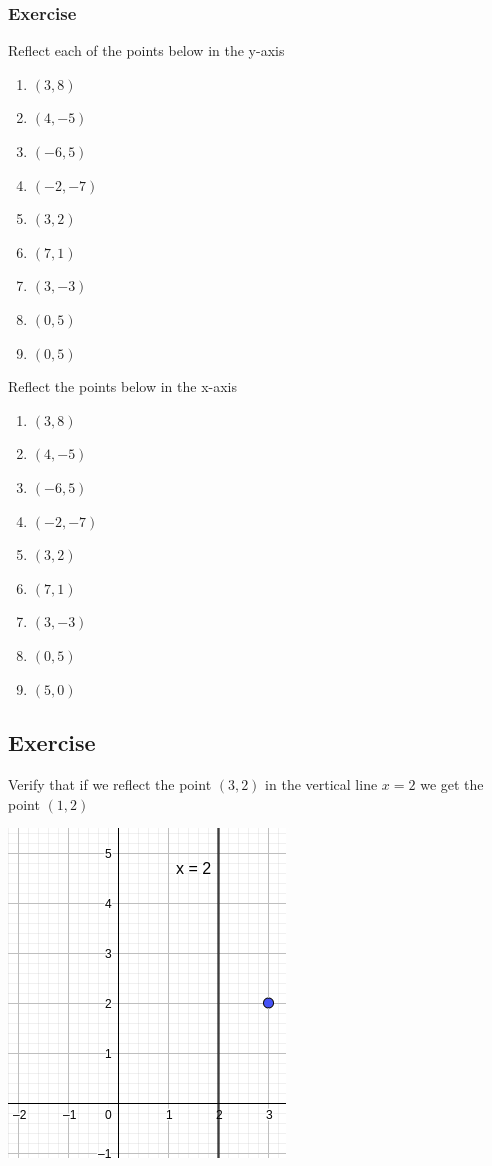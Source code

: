 \subsubsection{Exercise}
Reflect each of the points below in the y-axis
	\begin{enumerate}
		\item $(3, 8)$
		\item $(4, -5)$
		\item $(-6, 5)$
		\item $(-2, -7)$
		\item $(3, 2)$
		\item $(7, 1)$
		\item $(3, -3)$
		\item $(0, 5)$
		\item $(0, 5)$
	\end{enumerate}
	Reflect the points below in the x-axis
	\begin{enumerate}
		\item $(3, 8)$
		\item $(4, -5)$
		\item $(-6, 5)$
		\item $(-2, -7)$
		\item $(3, 2)$
		\item $(7, 1)$
		\item $(3, -3)$
		\item $(0, 5)$
		\item $(5, 0)$
	\end{enumerate}

\subsection{Exercise}
	Verify that if we reflect the point $(3, 2)$ in the vertical line $x = 2$ we get the point $(1, 2)$
	\bigskip

		\includegraphics[scale=0.6]{./Images/Transformations/Reflections_ex_5.png}

